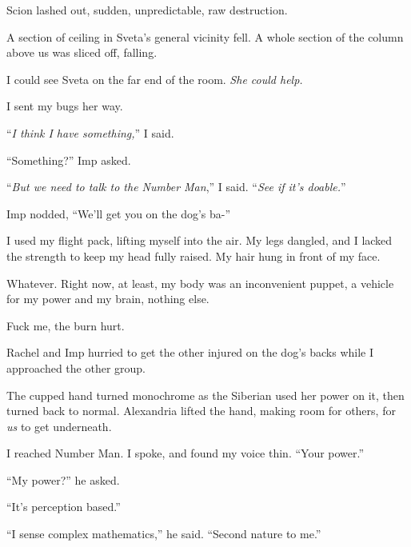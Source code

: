 Scion lashed out, sudden, unpredictable, raw destruction.



A section of ceiling in Sveta's general vicinity fell.  A whole section of the column above us was sliced off, falling.



I could see Sveta on the far end of the room.  \emph{She could help.}



I sent my bugs her way.



``\emph{I think I have something,}'' I said.



``Something?'' Imp asked.



``\emph{But we need to talk to the Number Man},'' I said.  ``\emph{See if it's doable.}''



Imp nodded, ``We'll get you on the dog's ba-''



I used my flight pack, lifting myself into the air.  My legs dangled, and I lacked the strength to keep my head fully raised.  My hair hung in front of my face.



Whatever.  Right now, at least, my body was an inconvenient puppet, a vehicle for my power and my brain, nothing else.



Fuck me, the burn hurt.



Rachel and Imp hurried to get the other injured on the dog's backs while I approached the other group.



The cupped hand turned monochrome as the Siberian used her power on it, then turned back to normal.  Alexandria lifted the hand, making room for others, for \emph{us} to get underneath.



I reached Number Man.  I spoke, and found my voice thin.  ``Your power.''



``My power?'' he asked.



``It's perception based.''



``I sense complex mathematics,'' he said.  ``Second nature to me.''




